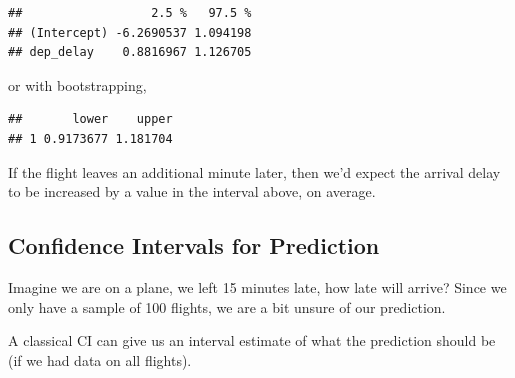 \documentclass[]{book}
\newenvironment{Shaded}{\begin{snugshade}}{\end{snugshade}}
\newcommand{\CommentTok}[1]{\textcolor[rgb]{0.56,0.35,0.01}{\textit{#1}}}
\newcommand{\DataTypeTok}[1]{\textcolor[rgb]{0.13,0.29,0.53}{#1}}
\newcommand{\DecValTok}[1]{\textcolor[rgb]{0.00,0.00,0.81}{#1}}
\newcommand{\KeywordTok}[1]{\textcolor[rgb]{0.13,0.29,0.53}{\textbf{#1}}}
\newcommand{\NormalTok}[1]{#1}
\newcommand{\OperatorTok}[1]{\textcolor[rgb]{0.81,0.36,0.00}{\textbf{#1}}}
\newcommand{\OtherTok}[1]{\textcolor[rgb]{0.56,0.35,0.01}{#1}}
\newcommand{\StringTok}[1]{\textcolor[rgb]{0.31,0.60,0.02}{#1}}
\begin{document}
\begin{verbatim}
##                  2.5 %   97.5 %
## (Intercept) -6.2690537 1.094198
## dep_delay    0.8816967 1.126705
\end{verbatim}

or with bootstrapping,

\begin{Shaded}
\end{Shaded}

\begin{verbatim}
##       lower    upper
## 1 0.9173677 1.181704
\end{verbatim}

If the flight leaves an additional minute later, then we'd expect the arrival delay to be increased by a value in the interval above, on average.

\hypertarget{confidence-intervals-for-prediction}{%
\subsection{Confidence Intervals for Prediction}\label{confidence-intervals-for-prediction}}

Imagine we are on a plane, we left 15 minutes late, how late will arrive? Since we only have a sample of 100 flights, we are a bit unsure of our prediction.

A classical CI can give us an interval estimate of what the prediction should be (if we had data on all flights).
\end{document}

